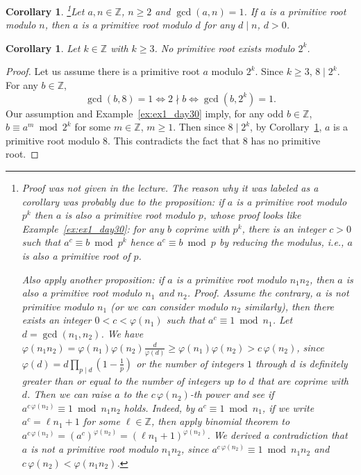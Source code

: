 \documentclass{amsbook}
\theoremstyle{plain}
\newtheorem{corollary}[theorem]{Corollary}
\theoremstyle{definition}
\theoremstyle{remark}
\numberwithin{equation}{chapter}
\numberwithin{figure}{chapter}
\newcommand{\Z}{\mathbb{Z}}
\begin{document}
\begin{corollary}\label{cor:prim_rt_n_prim_rt_d}
\footnote{Proof was not given in the lecture. The reason why it was labeled as a corollary was probably due to the proposition: if $a$ is a primitive root modulo $p^k$ then $a$ is also a primitive root modulo $p$, whose proof looks like Example~\ref{ex:ex1_day30}: for any $b$  coprime with $p^k$, there is an integer $c > 0$ such that $a^c \equiv b \bmod p^k$ hence $a^c \equiv b \bmod p$ by reducing the modulus, i.e., $a$ is also a primitive root of $p$.
    
Also apply another proposition: if $a$ is a primitive root modulo $n_1n_2$, then $a$ is also a primitive root modulo $n_1$ and $n_2$. Proof. Assume the contrary, $a$ is not primitive modulo $n_1$ (or we can consider modulo $n_2$ similarly), then there exists an integer $0 < c < \varphi (n_1)$ such that $a^c \equiv 1 \bmod n_1$. Let $d = \gcd (n_1, n_2)$. We have $\varphi (n_1n_2) = \varphi (n_1) \varphi (n_2) \frac{d}{\varphi (d)} \geqslant \varphi (n_1) \varphi (n_2) > c \, \varphi (n_2)$, since $\varphi (d) = d \prod_{p \mid d} (1 - \frac{1}p)$ or the number of integers $1$ through $d$ is definitely greater than or equal to the number of integers up to $d$ that are coprime with $d$. Then we can raise $a$ to the $c\,\varphi(n_2)$-th power and see if $a^{c\,\varphi(n_2)} \equiv 1 \bmod n_1n_2$ holds. Indeed, by $a^c \equiv 1 \bmod n_1$, if we write $a^c = \ell n_1 + 1$ for some $\ell \in \Z$, then apply binomial theorem to $a^{c\,\varphi(n_2)} = (a^c)^{\varphi(n_2)} = (\ell n_1 + 1)^{\varphi(n_2)}$. We derived a contradiction that $a$ is not a primitive root modulo $n_1n_2$, since $a^{c\,\varphi(n_2)} \equiv 1 \bmod n_1n_2$ and $c\, \varphi(n_2) < \varphi (n_1n_2)$.}Let $a, n \in \Z$, $n \geqslant 2$ and $\gcd (a, n) = 1$. If $a$ is a primitive root modulo $n$, then $a$ is a primitive root modulo $d$ for any $d \mid n$, $d > 0$.
\end{corollary}

\begin{corollary}\label{cor:2k_no_prim_rt}
  Let $k \in \Z$ with $k \geqslant 3$. No primitive root exists modulo $2^k$.
\end{corollary}
\begin{proof}
  Let us assume there is a primitive root $a$ modulo $2^k$. Since $k \geqslant 3$, $8 \mid 2^k$. For any $b \in \Z$,
  \[
    \gcd (b, 8) = 1 \iff 2 \nmid b  \iff \gcd (b, 2^k) = 1.
  \]
  Our assumption and Example~\ref{ex:ex1_day30} imply, for any odd $b \in \Z$, $b \equiv a^m \bmod 2^k$ for some $m \in \Z$, $m \geqslant 1$. Then since $8 \mid 2^k$, by Corollary~\ref{cor:prim_rt_n_prim_rt_d}, $a$ is a primitive root modulo $8$. This contradicts the fact that $8$ has no primitive root.
\end{proof}
\end{document}
